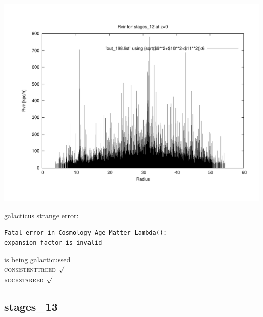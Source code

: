 \includegraphics[scale=0.3]{stages_12/plot_rvir_z0.pdf}

galacticus strange error: 
\begin{verbatim}
Fatal error in Cosmology_Age_Matter_Lambda():
expansion factor is invalid
\end{verbatim}
is being galacticussed \\
\textsc{consistenttreed} $\surd$ \\ 
\textsc{rockstarred} $\surd$

% 
%
%
%
%
%
%
%

\newpage
\subsection{stages\_13}

